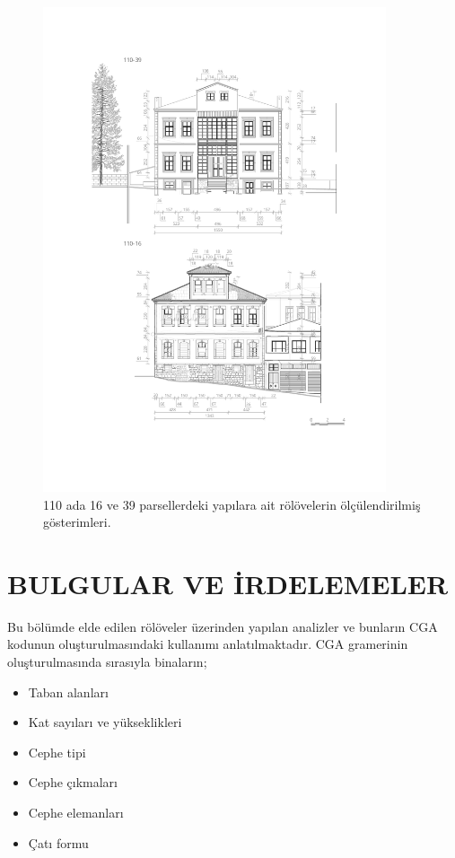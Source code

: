 \documentclass[12pt,turkish,a4paperpaper,]{report}
\providecommand{\tightlist}{%
  \setlength{\itemsep}{0pt}\setlength{\parskip}{0pt}}
\begin{document}
\begin{figure}
\centering
\includegraphics[width=0.9\textwidth,height=\textheight]{source/figures/RoloveOranlar.pdf}
\caption{110 ada 16 ve 39 parsellerdeki yapılara ait rölövelerin
ölçülendirilmiş gösterimleri. \label{roloveoran}}
\end{figure}

\newpage

\hypertarget{bulgular-ve-irdelemeler}{%
\chapter{BULGULAR VE İRDELEMELER}\label{bulgular-ve-irdelemeler}}

\thispagestyle{empty}

Bu bölümde elde edilen rölöveler üzerinden yapılan analizler ve bunların
CGA kodunun oluşturulmasındaki kullanımı anlatılmaktadır. CGA gramerinin
oluşturulmasında sırasıyla binaların;

\begin{itemize}
\tightlist
\item
  Taban alanları
\item
  Kat sayıları ve yükseklikleri
\item
  Cephe tipi
\item
  Cephe çıkmaları
\item
  Cephe elemanları
\item
  Çatı formu
\end{itemize}
\end{document}

